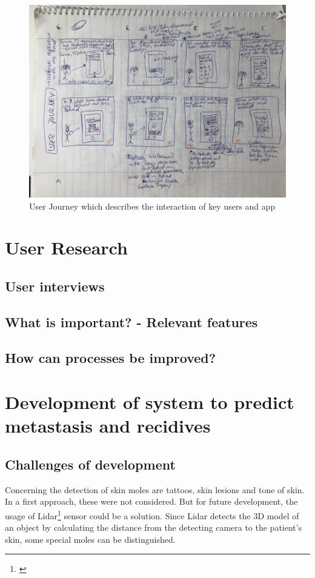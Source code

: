 \begin{figure}[h!]
	\centering
	\includegraphics[width=1\textwidth]{images/userjourney.jpg}
	\caption{User Journey which describes the interaction of key users and app}
	\label{verticallatter}
\end{figure}

\section{User Research}
\subsection{User interviews}
\subsection{What is important? - Relevant features}
\subsection{How can processes be improved?}


\section{Development of system to predict metastasis and recidives} 

\subsection{Challenges of development}
Concerning the detection of skin moles are tattoos, skin lesions and tone of skin. In a first approach, these were not considered. But for future development, the usage of Lidar\footnote{\cite{czichos_introduction_2018}} sensor could be a solution. Since Lidar detects the 3D model of an object by calculating the distance from the detecting camera to the patient's skin, some special moles can be distinguished. 

